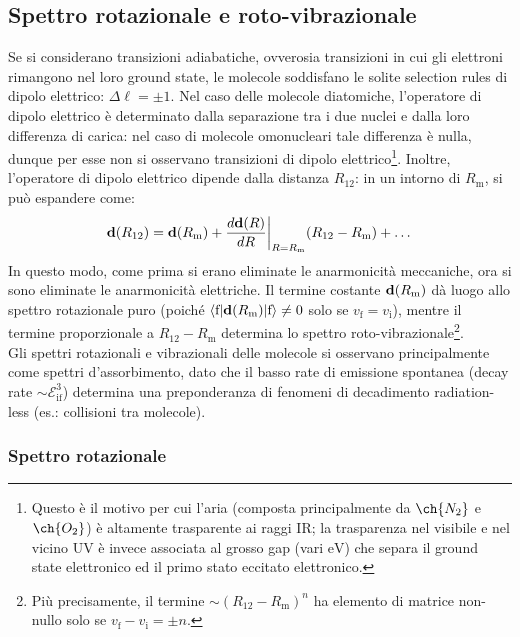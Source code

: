 \subsection{Spettro rotazionale e roto-vibrazionale}

Se si considerano transizioni adiabatiche, ovverosia transizioni in cui gli elettroni rimangono nel loro ground state, le molecole soddisfano le solite selection rules di dipolo elettrico: $ \Delta \ell = \pm 1 $.
Nel caso delle molecole diatomiche, l'operatore di dipolo elettrico è determinato dalla separazione tra i due nuclei e dalla loro differenza di carica: nel caso di molecole omonucleari tale differenza è nulla, dunque per esse non si osservano transizioni di dipolo elettrico\footnote{Questo è il motivo per cui l'aria (composta principalmente da $ \ch{N_2} $ e $ \ch{O_2} $) è altamente trasparente ai raggi IR; la trasparenza nel visibile e nel vicino UV è invece associata al grosso gap (vari $ \text{eV} $) che separa il ground state elettronico ed il primo stato eccitato elettronico.}. Inoltre, l'operatore di dipolo elettrico dipende dalla distanza $ R_{12} $: in un intorno di $ R_\text{m} $, si può espandere come:
\begin{equation*}
	\mathbf{d}(R_{12}) = \mathbf{d}(R_\text{m}) + \frac{d\mathbf{d}(R)}{dR}\bigg\vert_{R = R_\text{m}} (R_{12} - R_\text{m}) + \dots
\end{equation*}
In questo modo, come prima si erano eliminate le anarmonicità meccaniche, ora si sono eliminate le anarmonicità elettriche. Il termine costante $ \mathbf{d}(R_\text{m}) $ dà luogo allo spettro rotazionale puro (poiché $ \braket{\text{f} | \mathbf{d}(R_\text{m}) | \text{f}} \neq 0 $ solo se $ v_\text{f} = v_\text{i} $), mentre il termine proporzionale a $ R_{12} - R_\text{m} $ determina lo spettro roto-vibrazionale\footnote{Più precisamente, il termine $ \sim (R_{12} - R_\text{m})^n $ ha elemento di matrice non-nullo solo se $ v_\text{f} - v_\text{i} = \pm n $.}. \\
Gli spettri rotazionali e vibrazionali delle molecole si osservano principalmente come spettri d'assorbimento, dato che il basso rate di emissione spontanea (decay rate $ \sim \mathcal{E}_\text{if}^3 $) determina una preponderanza di fenomeni di decadimento radiation-less (es.: collisioni tra molecole).

\subsubsection{Spettro rotazionale}

